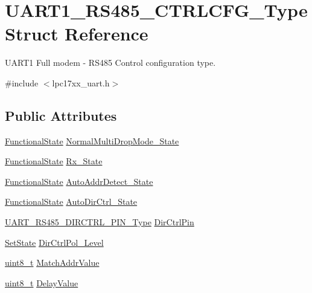 \hypertarget{struct_u_a_r_t1___r_s485___c_t_r_l_c_f_g___type}{}\section{U\+A\+R\+T1\+\_\+\+R\+S485\+\_\+\+C\+T\+R\+L\+C\+F\+G\+\_\+\+Type Struct Reference}
\label{struct_u_a_r_t1___r_s485___c_t_r_l_c_f_g___type}


U\+A\+R\+T1 Full modem -\/ R\+S485 Control configuration type.  




{\ttfamily \#include $<$lpc17xx\+\_\+uart.\+h$>$}

\subsection*{Public Attributes}
\begin{DoxyCompactItemize}
\item 
\hyperlink{agilefox_2library_2inc_2stm32f10x__type_8h_ac9a7e9a35d2513ec15c3b537aaa4fba1}{Functional\+State} \hyperlink{struct_u_a_r_t1___r_s485___c_t_r_l_c_f_g___type_aa2f683b91877a1f1e583484352d9eadc}{Normal\+Multi\+Drop\+Mode\+\_\+\+State}
\item 
\hyperlink{agilefox_2library_2inc_2stm32f10x__type_8h_ac9a7e9a35d2513ec15c3b537aaa4fba1}{Functional\+State} \hyperlink{struct_u_a_r_t1___r_s485___c_t_r_l_c_f_g___type_a087a5f4310b65eaf41efc5295b8b841e}{Rx\+\_\+\+State}
\item 
\hyperlink{agilefox_2library_2inc_2stm32f10x__type_8h_ac9a7e9a35d2513ec15c3b537aaa4fba1}{Functional\+State} \hyperlink{struct_u_a_r_t1___r_s485___c_t_r_l_c_f_g___type_a93f18ca28cd7e67195e6d59c211a7709}{Auto\+Addr\+Detect\+\_\+\+State}
\item 
\hyperlink{agilefox_2library_2inc_2stm32f10x__type_8h_ac9a7e9a35d2513ec15c3b537aaa4fba1}{Functional\+State} \hyperlink{struct_u_a_r_t1___r_s485___c_t_r_l_c_f_g___type_a6596686b19bae7e391c53cba9299a983}{Auto\+Dir\+Ctrl\+\_\+\+State}
\item 
\hyperlink{group___u_a_r_t___public___types_gabcfaaf12f325112107ff9b5c5cf1120c}{U\+A\+R\+T\+\_\+\+R\+S485\+\_\+\+D\+I\+R\+C\+T\+R\+L\+\_\+\+P\+I\+N\+\_\+\+Type} \hyperlink{struct_u_a_r_t1___r_s485___c_t_r_l_c_f_g___type_acfebf68b0964d3117933ff33be054227}{Dir\+Ctrl\+Pin}
\item 
\hyperlink{group___l_p_c___types___public___types_ga7fab312a9f10f1386a955977d2ec96fe}{Set\+State} \hyperlink{struct_u_a_r_t1___r_s485___c_t_r_l_c_f_g___type_a8ef36fc7dfce726385b7114fb8429589}{Dir\+Ctrl\+Pol\+\_\+\+Level}
\item 
\hyperlink{_p_e___types_8h_aba7bc1797add20fe3efdf37ced1182c5}{uint8\+\_\+t} \hyperlink{struct_u_a_r_t1___r_s485___c_t_r_l_c_f_g___type_a56883cdc3cee7c7dab7859f55ae9848e}{Match\+Addr\+Value}
\item 
\hyperlink{_p_e___types_8h_aba7bc1797add20fe3efdf37ced1182c5}{uint8\+\_\+t} \hyperlink{struct_u_a_r_t1___r_s485___c_t_r_l_c_f_g___type_accdbb998ed22a2ba62ba6ed131dbae16}{Delay\+Value}
\end{DoxyCompactItemize}


